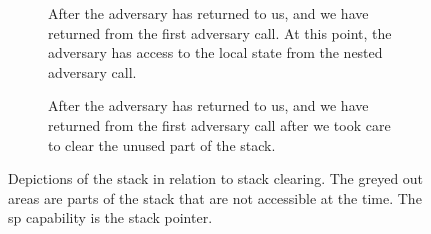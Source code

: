 \documentclass[format=acmsmall, review=true, screen=true]{acmart}
\begin{document}
\begin{figure}[ptb]
\begin{subfigure}[t]{0.3\linewidth}
  \caption{After the adversary has returned to us, and we have
    returned from the first adversary call. At this point, the adversary has
    access to the local state from the nested adversary call.}
  \label{fig:illu-adv-data}
\end{subfigure}
\begin{subfigure}[t]{0.02\linewidth}
  \phantom{a}
\end{subfigure}
  \begin{subfigure}[t]{0.3\linewidth}
  \caption{After the adversary has returned to us, and we have
    returned from the first adversary call after we took care to clear the
    unused part of the stack.}
  \label{fig:illu-clear-all}
  \end{subfigure}
  \caption{Depictions of the stack in relation to stack clearing.
    The greyed out areas are parts of the stack that are not accessible at the
    time.
    The sp capability is the stack pointer.}
  \label{fig:ret-adv2}
\end{figure}
\end{document}
